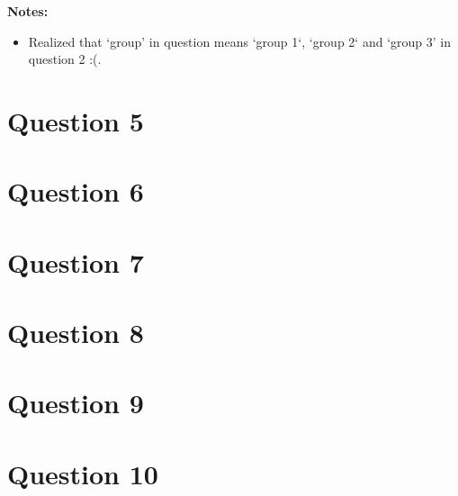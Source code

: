\documentclass[12pt]{article}
\begin{document}
\bigskip

\textbf{Notes:}

\begin{itemize}
    \item Realized that `group' in question means `group 1`, `group 2` and `group 3' in question 2 :(.
\end{itemize}

\section*{Question 5}

\section*{Question 6}

\section*{Question 7}

\section*{Question 8}

\section*{Question 9}

\section*{Question 10}
\end{document}

